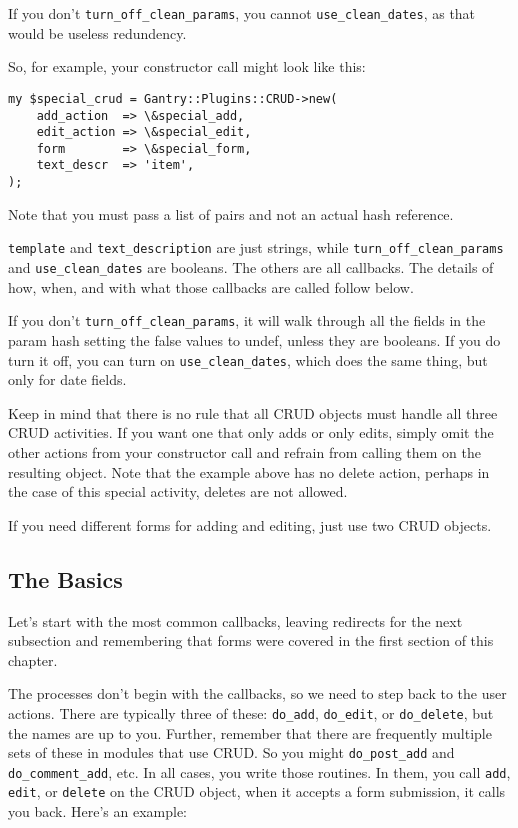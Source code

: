 If you don't \verb+turn_off_clean_params+, you cannot
\verb+use_clean_dates+, as that would be useless redundency.

So, for example, your constructor call might look like this:

\begin{verbatim}
my $special_crud = Gantry::Plugins::CRUD->new(
    add_action  => \&special_add,
    edit_action => \&special_edit,
    form        => \&special_form,
    text_descr  => 'item',
);
\end{verbatim}

Note that you must pass a list of pairs and not an actual hash reference.

\verb+template+ and \verb+text_description+ are just strings,
while \verb+turn_off_clean_params+ and \verb+use_clean_dates+ are booleans.
The others are all callbacks.  The details of how, when, and with what those
callbacks are called follow below.

If you don't \verb+turn_off_clean_params+, it will walk through all
the fields in the param hash setting the false values to undef, unless
they are booleans.  If you do turn it off, you can turn on
\verb+use_clean_dates+, which does the same thing, but only for date fields.

Keep in mind that there is no rule that all CRUD objects must handle all
three CRUD activities.  If you want one that only adds or only edits, simply
omit the other actions from your constructor call and refrain from calling
them on the resulting object.  Note that the example above has no delete
action, perhaps in the case of this special activity, deletes are not allowed.

If you need different forms for adding and editing, just use two CRUD objects.

\subsection*{The Basics}

Let's start with the most common callbacks, leaving redirects for the next
subsection and remembering that forms were covered in the first section of
this chapter.

The processes don't begin with the callbacks, so we need to step back to the
user actions.  There are typically three of these: \verb+do_add+,
\verb+do_edit+, or \verb+do_delete+, but the names are up to you.  Further,
remember that there are frequently multiple sets of these in modules that
use CRUD.  So you might \verb+do_post_add+ and \verb+do_comment_add+, etc.
In all cases, you write those routines.  In them, you call \verb+add+,
\verb+edit+, or \verb+delete+ on the CRUD object, when it accepts a form
submission, it calls you back.  Here's an example:


